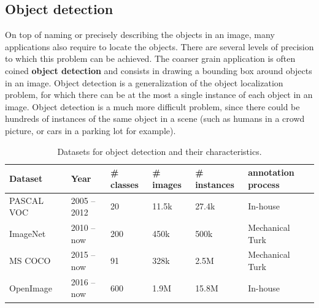 \subsection{Object detection}

On top of naming or precisely describing the objects in an image,
many applications also require to locate the objects.
There are several levels of precision to which this problem can be achieved.
The coarser grain application is often coined \textbf{object detection}
and consists in drawing a bounding box around objects in an image.
Object detection is a generalization of the object localization problem,
for which there can be at the most a single instance of each object in an image.
Object detection is a much more difficult problem,
since there could be hundreds of instances of the same object in a scene
(such as humans in a crowd picture, or cars in a parking lot for example).

\begin{table}
\centering
\caption{Datasets for object detection and their characteristics.}
\begin{tabular}{llllll}
	Dataset & Year & \# classes & \# images & \# instances & annotation process \\
	\midrule
	PASCAL VOC~\cite{Everingham10} & 2005 -- 2012 & 20 & 11.5k & 27.4k & In-house \\
	ImageNet~\cite{ILSVRC15} & 2010 -- now & 200 & 450k & 500k & Mechanical Turk \\
	MS COCO~\cite{lin2014microsoft} & 2015 -- now & 91 & 328k & 2.5M & Mechanical Turk \\
	OpenImage~\cite{OpenImages, OpenImages2} & 2016 -- now & 600 & 1.9M & 15.8M & In-house \\
\end{tabular}%
\label{tab:detection_ds}
\end{table}

